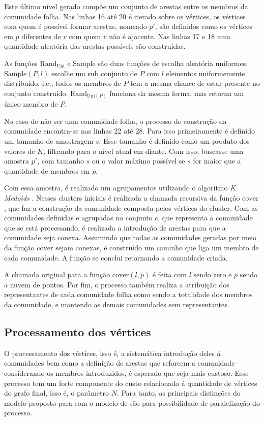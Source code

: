 \documentclass[notes.tex]{subfiles}
\begin{document}
Este último nível gerado compõe um conjunto de arestas entre os membros da comunidade folha.
Nas linhas 16 até 20 é iterado sobre os vértices, os vértices com quem é possível formar arestas, nomeado $p'$, são definidos como os vértices em $p$ diferentes de $v$ com quem $v$ não é ajacente.
Nas linhas 17 e 18 uma quantidade aleatória das arestas possíveis são construídas.

As funções $\text{Rand}_{\text{Uni}}$ e $\text{Sample}$ são duas funções de escolha aleatória uniformes.
$\text{Sample}(P, l)$ escolhe um sub conjunto de $P$ com $l$ elementos uniformemente distribuído, i.e., todos os membros de $P$ tem a mesma chance de estar presente no conjunto construído.
$\text{Rand}_{\text{Uni}(P)}$ funciona da mesma forma, mas retorna um único membro de $P$.

No caso de não ser uma comunidade folha, o processo de construção da comunidade encontra-se nas linhas 22 até 28.
Para isso primeiramente é definido um tamanho de amostragem $s$.
Esse tamanho é definido como um produto dos valores de $K$, filtrando para o nível atual em diante.
Com isso, buscasse uma amostra $p'$, com tamanho  $s$ ou o valor máximo possível se  $s$ for maior que a quantidade de membros em  $p$.

Com essa amostra, é realizado um agrupamentos utilizando o algoritmo \emph{K Medoids} \cite{largeron2015generating}.
Nesses clusters iniciais é realizada a chamada recursiva da função $\text{cover}$, que faz a construção da comunidade composta pelos vértices do cluster.
Com as comunidades definidas e agrupadas no conjunto $c$, que representa a comunidade que se está processando, é realizada a introdução de arestas para que a comunidade seja conexa.
Assumindo que todas as comunidades geradas por meio da função  $\text{cover}$ sejam conexas, é construído um caminho que liga um membro de cada comunidade.
A função se conclui retornando a comunidade criada.

A chamada original para a função $\text{cover}(l, p)$ é feita com $l$ sendo zero e  $p$ sendo a nuvem de pontos.
Por fim, o processo também realiza a atribuição dos representantes de cada comunidade folha como sendo a totalidade dos membros da comunidade, e mantendo as demais comunidades sem representantes.

\subsection{Processamento dos vértices}

O processamento dos vértices, isso é, a sistemática introdução deles á comunidades bem como a definição de arestas que reforcem a comunidade considerando os membros introduzidos, é esperado que seja mais custoso.
Esse processo tem um forte componente do custo relacionado á quantidade de vértices do grafo final, isso é, o parâmetro $N$.
Para tanto, as principais distinções do modelo proposto para com o modelo de  são para possibilidade de paralelização do processo.
\end{document}

